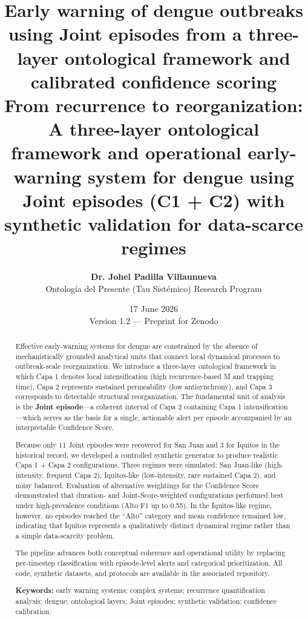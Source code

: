 \documentclass[11pt,a4paper]{article}
\title{\textbf{Early warning of dengue outbreaks using Joint episodes from a three-layer ontological framework and calibrated confidence scoring}\\[0.35em]
\large From recurrence to reorganization: A three-layer ontological framework and operational early-warning system for dengue using Joint episodes (C1 + C2) with synthetic validation for data-scarce regimes}
\author{
    \textbf{Dr. Johel Padilla Villaunueva} \\[0.25em]
    \small Ontolog\'ia del Presente (Tau Sist\'emico) Research Program
}
\date{17 June 2026 \\ \small Version 1.2 — Preprint for Zenodo}
\begin{document}
\maketitle

\begin{abstract}
\noindent Effective early-warning systems for dengue are constrained by the absence of mechanistically grounded analytical units that connect local dynamical processes to outbreak-scale reorganization. We introduce a three-layer ontological framework in which Capa 1 denotes local intensification (high recurrence-based M and trapping time), Capa 2 represents sustained permeability (low antisynchrony), and Capa 3 corresponds to detectable structural reorganization. The fundamental unit of analysis is the \textbf{Joint episode}—a coherent interval of Capa 2 containing Capa 1 intensification—which serves as the basis for a single, actionable alert per episode accompanied by an interpretable Confidence Score.

Because only 11 Joint episodes were recovered for San Juan and 3 for Iquitos in the historical record, we developed a controlled synthetic generator to produce realistic Capa 1 + Capa 2 configurations. Three regimes were simulated: San Juan-like (high-intensity, frequent Capa 2), Iquitos-like (low-intensity, rare sustained Capa 2), and noisy balanced. Evaluation of alternative weightings for the Confidence Score demonstrated that duration- and Joint-Score-weighted configurations performed best under high-prevalence conditions (Alto F1 up to 0.55). In the Iquitos-like regime, however, no episodes reached the “Alto” category and mean confidence remained low, indicating that Iquitos represents a qualitatively distinct dynamical regime rather than a simple data-scarcity problem.

The pipeline advances both conceptual coherence and operational utility by replacing per-timestep classification with episode-level alerts and categorical prioritization. All code, synthetic datasets, and protocols are available in the associated repository.

\vspace{0.2em}
\noindent\textbf{Keywords:} early warning systems; complex systems; recurrence quantification analysis; dengue; ontological layers; Joint episodes; synthetic validation; confidence calibration.
\end{abstract}
\end{document}

